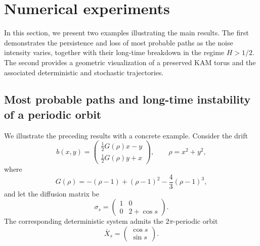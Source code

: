 \documentclass[preprint,12pt]{elsarticle}
\theoremstyle{definition}
\theoremstyle{plain}
\begin{document}
\section{Numerical experiments}
In this section, we present two examples illustrating the main results.
The first demonstrates the persistence and loss of most probable paths
as the noise intensity varies, together with their long-time breakdown
in the regime $H>1/2$. The second provides a geometric visualization
of a preserved KAM torus and the associated deterministic and
stochastic trajectories.

\subsection{Most probable paths and long-time instability of a periodic orbit} 
We illustrate the preceding results with a concrete example. Consider the drift
\begin{equation*}
    b(x,y)
    =
    \begin{pmatrix}
        \tfrac{1}{2}G(\rho)x-y\\[1mm]
        \tfrac{1}{2}G(\rho)y+x
    \end{pmatrix},
    \qquad
    \rho=x^2+y^2,
\end{equation*}
where
\begin{equation*}
    G(\rho)
    =
    -(\rho-1)+(\rho-1)^2-\frac{4}{3}(\rho-1)^3,
\end{equation*}
and let the diffusion matrix be
\begin{equation*}
    \sigma_s
    =
    \begin{pmatrix}
        1 & 0\\
        0 & 2+\cos s
    \end{pmatrix}.
\end{equation*}
The corresponding deterministic system admits the $2\pi$-periodic orbit
\begin{equation*}
    \bar X_s
    =
    \begin{pmatrix}
        \cos s\\
        \sin s
    \end{pmatrix}.
\end{equation*}
\end{document}
